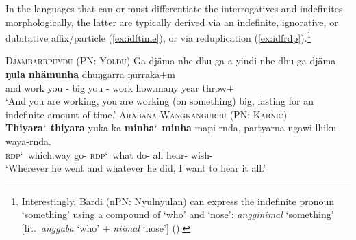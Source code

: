 \documentclass[12pt,egregdoesnotlikesansseriftitles]{scrartcl}
\begin{document}
In the languages that can or must differentiate the interrogatives and indefinites morphologically, the latter are typically derived via an indefinite, ignorative, or dubitative affix/particle (\ref{ex:idftime}), or via reduplication (\ref{ex:idfrdp}).\footnote{Interestingly, Bardi (nPN: Nyulnyulan) can express the indefinite pronoun `something' using a compound of `who' and `nose': \textit{angginimal} `something' [lit.\ \textit{anggaba} `who' + \textit{niimal} `nose'] (\citealt[321]{bowern12}).}
\begin{exe}
  \ex\label{ex:idftime} \textsc{Djambarrpuyŋu (PN: Yolŋu)}\hfill {}
  \gll %
  Ga djäma nhe dhu ga-a yindi nhe dhu ga djäma \textbf{ŋula} \textbf{nhämunha} dhuŋgarra ŋurraka$+$m\\
  and work you \Fut{} \Impv-\First{} big you \Fut{} \Impv-\First{} work  how.many year throw$+$\First\\
  \glt `And you are working, you are working (on something) big, lasting for an indefinite amount of time.'
  \ex\label{ex:idfrdp} \textsc{Arabana-Wangkangurru (PN: Karnic)}\hfill {}
  \gll \textbf{Thiyara}\char`~\textbf{thiyara} yuka-ka \textbf{minha}\char`~\textbf{minha} mapi-rnda, partyarna ngawi-lhiku waya-rnda.\\
  \textsc{rdp}\char`~which.way go-\Pst{} \textsc{rdp}\char`~what do-\Prs{} all hear-\Purp{} wish-\Prs\\
  \glt `Wherever he went and whatever he did, I want to hear it all.' %
\end{exe}
\end{document}
